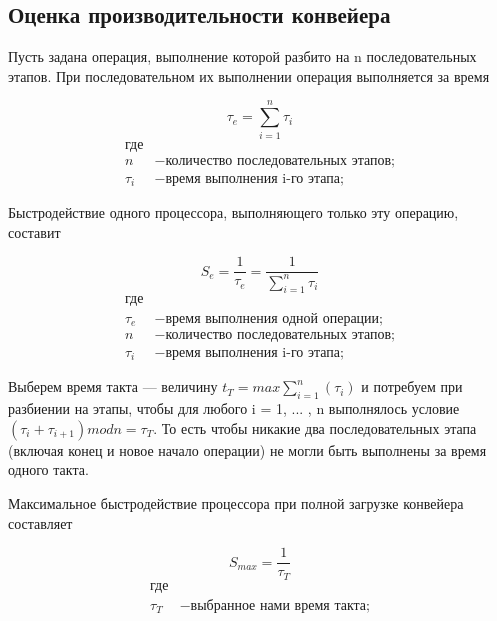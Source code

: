 \documentclass[a4paper, 14pt]{article}
\begin{document}
\subsection{Оценка производительности конвейера}

Пусть задана операция, выполнение которой разбито на n последовательных этапов. При последовательном их выполнении операция выполняется за время

\begin{equation}\label{form:way}
 \tau _{e}={\sum\limits_{i=1}^n \tau _{i}}
 \end{equation}
 \begin{align*}
    \text{где} \\
    n &- \text{количество последовательных этапов;} \\
   \tau _{i} &- \text{время выполнения i-го этапа;}
\end{align*}

Быстродействие одного процессора, выполняющего только эту операцию, составит

\begin{equation}\label{form:way}
 S_{e}={\frac{1}{\tau _{e}}}={\frac{1}{\sum\limits_{i=1}^n \tau _{i}}}
 \end{equation}
 \begin{align*}
    \text{где} \\
    \tau _{e} &- \text{время выполнения одной операции;} \\
    n &- \text{количество последовательных этапов;} \\
   \tau _{i} &- \text{время выполнения i-го этапа;}
\end{align*}

Выберем время такта — величину $t _{T} = max{\sum\limits_{i=1}^n(\tau_{i})}$ и потребуем при разбиении на этапы, чтобы для любого i = 1, ... , n выполнялось условие $(\tau_{i} + \tau_{i+1}) mod n = \tau_{T}$. То есть чтобы никакие два последовательных этапа (включая конец и новое начало операции) не могли быть выполнены за время одного такта.

Максимальное быстродействие процессора при полной загрузке конвейера составляет

\begin{equation}\label{form:way}
 S_{max}={\frac{1}{\tau _{T}}}
 \end{equation}
 \begin{align*}
    \text{где} \\
    \tau _{T} &- \text{выбранное нами время такта;}
\end{align*}
\end{document}
